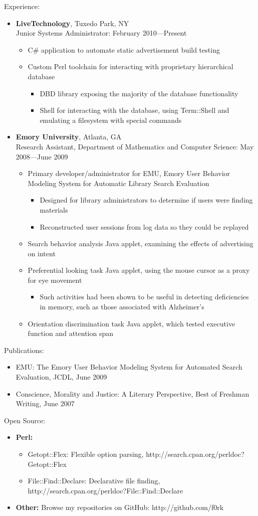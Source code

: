 \documentclass[10pt,oneside]{article}
\newenvironment{ressection}[1]{
	\vspace{1pt}
	{\fontfamily{phv}\selectfont\Large#1}
	\begin{itemize}
	\vspace{1pt}
}{
	\end{itemize}
}
\newcommand{\resitem}[1]{
	\vspace{-4pt}
	\item \begin{flushleft} #1 \end{flushleft}
}
\newcommand{\ressubitem}[1]{
	\vspace{-2pt}
	\item \begin{flushleft} #1 \end{flushleft}
}
\newcommand{\ressubsubitem}[1]{
	\vspace{-2pt}
    \begin{itemize} \item #1 \end{itemize}
}
\newcommand{\resbigitem}[3]{
	\vspace{-5pt}
	\item
	\textbf{#1}, #2 \\
	#3
}
\newenvironment{ressubsec}[3]{
	\resbigitem{#1}{#2}{#3}
	\vspace{-2pt}
	\begin{itemize}
}{
	\end{itemize}
}
\newenvironment{reslist}[1]{
	\resitem{\textbf{#1}}
	\vspace{-5pt}
	\begin{itemize}
}{
	\end{itemize}
}
\begin{document}
\begin{ressection}{Experience:}

	\begin{ressubsec}{LiveTechnology}{Tuxedo Park, NY}{Junior Systems Administrator: February 2010---Present}
        \ressubitem{C\# application to automate static advertisement build testing}
		\ressubitem{Custom Perl toolchain for interacting with proprietary hierarchical database}
        \ressubsubitem{DBD library exposing the majority of the database functionality}
        \ressubsubitem{Shell for interacting with the database, using Term::Shell and emulating a filesystem with special commands}
    \end{ressubsec}

	\begin{ressubsec}{Emory University}{Atlanta, GA}{Research Assistant, Department of Mathematics and Computer Science: May 2008---June 2009}
		\ressubitem{Primary developer/administrator for EMU, Emory User Behavior Modeling System for Automatic Library Search Evaluation}
        \ressubsubitem{Designed for library administrators to determine if users were finding materials}
		\ressubsubitem{Reconstructed user sessions from log data so they could be replayed}
		\ressubitem{Search behavior analysis Java applet, examining the effects of advertising on intent} 
		\ressubitem{Preferential looking task Java applet, using the mouse cursor as a proxy for eye movement}
        \ressubsubitem{Such activities had been shown to be useful in detecting deficiencies in memory, such as those associated with Alzheimer's}
        \ressubitem{Orientation discrimination task Java applet, which tested executive function and attention span}
	\end{ressubsec}

\end{ressection}

\begin{ressection}{Publications:}

    \resitem{EMU: The Emory User Behavior Modeling System for Automated Search Evaluation, JCDL, June 2009}
    \resitem{Conscience, Morality and Justice: A Literary Perspective, Best of Freshman Writing, June 2007}
	
\end{ressection}

\begin{ressection}{Open Source:}

	\begin{reslist}{Perl:}
		\ressubitem{Getopt::Flex: Flexible option parsing, http://search.cpan.org/perldoc?Getopt::Flex}
		\ressubitem{File::Find::Declare: Declarative file finding, http://search.cpan.org/perldoc?File::Find::Declare}
	\end{reslist}

    \resitem{\textbf{Other:} Browse my repositories on GitHub: http://github.com/f0rk}

\end{ressection}
\end{document}
